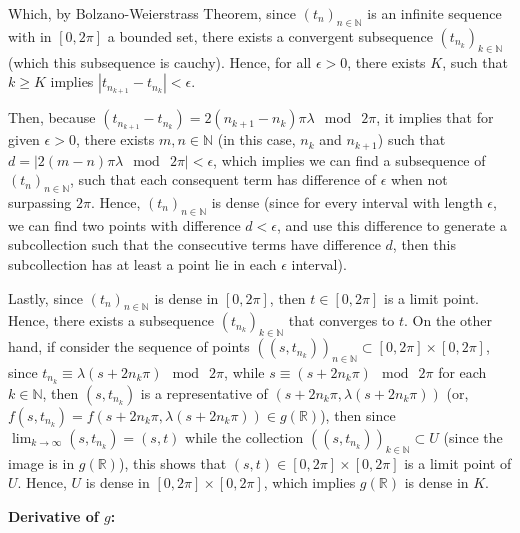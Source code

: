 \documentclass{article}
\begin{document}
\begin{itemize}
    Which, by Bolzano-Weierstrass Theorem, since $(t_n)_{n\in\mathbb{N}}$ is an infinite sequence with in $[0,2\pi]$ a bounded set, there exists a convergent subsequence $(t_{n_k})_{k\in\mathbb{N}}$ (which this subsequence is cauchy).
    Hence, for all $\epsilon>0$, there exists $K$, such that $k\geq K$ implies $|t_{n_{k+1}}-t_{n_k}|<\epsilon$.

    Then, because $(t_{n_{k+1}}-t_{n_k}) = 2(n_{k+1}-n_k)\pi\lambda \mod\ 2\pi$, it implies that for given $\epsilon>0$, there exists $m,n\in\mathbb{N}$ (in this case, $n_{k}$ and $n_{k+1}$) such that $d = |2(m-n)\pi\lambda\mod\ 2\pi| < \epsilon$, which implies we can find a subsequence of $(t_n)_{n\in\mathbb{N}}$,
    such that each consequent term has difference of $\epsilon$ when not surpassing $2\pi$. Hence, $(t_n)_{n\in\mathbb{N}}$ is dense (since for every interval with length $\epsilon$, we can find two points with difference $d<\epsilon$, and use this difference to generate a subcollection such that the consecutive terms have difference $d$, then this subcollection has at least a point lie in each $\epsilon$ interval).

    Lastly, since $(t_n)_{n\in\mathbb{N}}$ is dense in $[0,2\pi]$, then $t\in [0,2\pi]$ is a limit point. Hence, there exists a subsequence $(t_{n_k})_{k\in\mathbb{N}}$ that converges to $t$.
    On the other hand, if consider the sequence of points $((s,t_{n_k}))_{n\in\mathbb{N}}\subset [0,2\pi]\times [0,2\pi]$, since $t_{n_k}\equiv \lambda(s+2n_k\pi)\mod\ 2\pi$, while $s\equiv (s+2n_k\pi)\mod\ 2\pi$ for each $k\in\mathbb{N}$, then $(s,t_{n_k})$ is a representative of $(s+2n_k\pi, \lambda(s+2n_k\pi))$ (or, $f(s,t_{n_k})=f(s+2n_k\pi, \lambda(s+2n_k\pi))\in g(\mathbb{R})$),
    then since $\lim_{k\rightarrow\infty} (s,t_{n_k}) = (s,t)$ while the collection $((s,t_{n_k}))_{k\in\mathbb{N}}\subset U$ (since the image is in $g(\mathbb{R})$), this shows that $(s,t)\in [0,2\pi]\times [0,2\pi]$ is a limit point of $U$. Hence, $U$ is dense in $[0,2\pi]\times [0,2\pi]$, which implies $g(\mathbb{R})$ is dense in $K$.

    \hfil

    \textbf{Derivative of $g$:}


\end{itemize}
\end{document}
